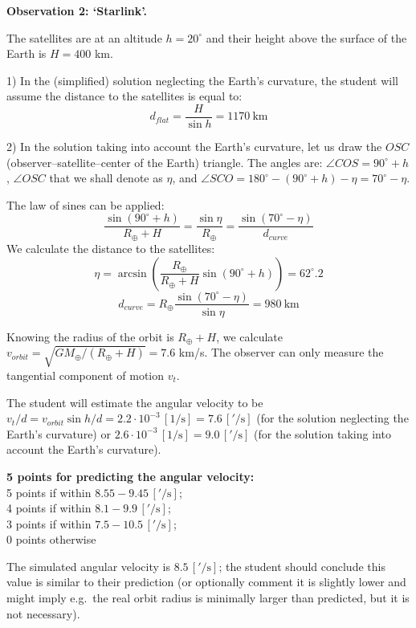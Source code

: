 \medskip
\textbf{Observation 2: `Starlink'.}

The satellites are at an altitude $h = 20^\circ$ and their height above the
surface of the Earth is $H = 400$ km.

1) In the (simplified) solution neglecting the Earth's curvature, the
student will assume the distance to the satellites is equal to:
\[
d_{flat} = \frac{H}{\sin h} = 1170~\mathrm{km}
\]


2) In the solution taking into account the Earth's curvature, let us draw
the $OSC$ (observer--satellite--center of the Earth) triangle. The angles
are: $\angle COS = 90^\circ + h$, $\angle OSC$ that we shall denote as
$\eta$, and $\angle SCO = 180^\circ - (90^\circ + h) - \eta = 70^\circ - \eta$.


The law of sines can be applied:
\[
\frac{\sin(90^\circ + h)}{R_\oplus + H} = \frac{\sin\eta}{R_\oplus}
= \frac{\sin(70^\circ - \eta)}{d_{curve}}
\]
We calculate the distance to the satellites:
\[
\eta = \arcsin\left(\frac{R_\oplus}{R_\oplus + H}\sin(90^\circ + h)\right)
= 62^\circ.2
\]
\[
d_{curve} = R_\oplus \frac{\sin(70^\circ - \eta)}{\sin\eta} = 980~\mathrm{km}
\]

Knowing the radius of the orbit is $R_\oplus + H$, we calculate
$v_{orbit} = \sqrt{GM_\oplus/(R_\oplus + H)} = 7.6$ km/s. The observer can
only measure the tangential component of motion $v_t$.

The student will estimate the angular velocity to be
$v_t/d = v_{orbit}\sin h/d = 2.2\cdot 10^{-3}\,[1/\mathrm{s}] = 7.6\,['/\mathrm{s}]$
(for the solution neglecting the Earth's curvature) or
$2.6\cdot 10^{-3}\,[1/\mathrm{s}] = 9.0\,['/\mathrm{s}]$ (for the solution
taking into account the Earth's curvature).

\begin{flushright}
\textbf{5 points for predicting the angular velocity:}\\
5 points if within $8.55 - 9.45\,['/\mathrm{s}]$;\\
4 points if within $8.1 - 9.9\,['/\mathrm{s}]$;\\
3 points if within $7.5 - 10.5\,['/\mathrm{s}]$;\\
0 points otherwise
\end{flushright}

The simulated angular velocity is $8.5\,['/\mathrm{s}]$; the student should
conclude this value is similar to their prediction (or optionally comment it
is slightly lower and might imply e.g.\ the real orbit radius is minimally
larger than predicted, but it is not necessary).

